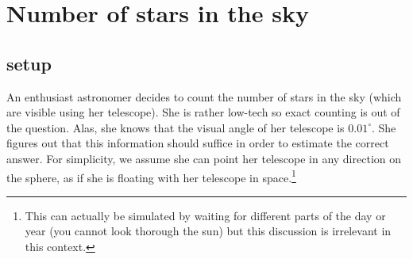 \documentclass{article}
\begin{document}


\section{Number of stars in the sky}
\subsection*{setup}
An enthusiast astronomer decides to count the number of stars in the sky (which are visible using her telescope).
She is rather low-tech so exact counting is out of the question. Alas, she knows that the visual angle of her telescope is $0.01^{\circ}$.
She figures out that this information should suffice in order to estimate the correct answer.
For simplicity, we assume she can point her telescope in any direction on the sphere, as if she is floating with her telescope in space.\footnote{This 
can actually be simulated by waiting for different parts of the day or year (you cannot look thorough the sun) but this discussion is irrelevant in this context.}
\end{document}
